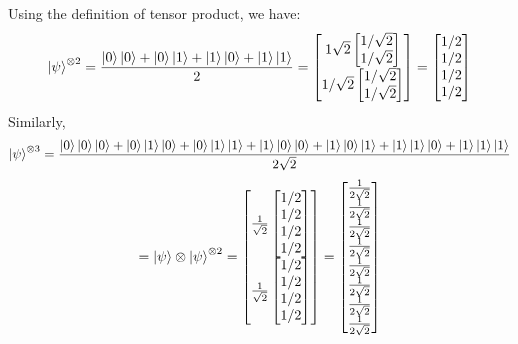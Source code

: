 \begin{example}
Using the definition of tensor product, we have:
\[
\ket{\psi}^{\otimes 2} = \frac{\ket{0}\ket{0}+\ket{0}\ket{1}+\ket{1}\ket{0}+\ket{1}\ket{1}}{2}=\begin{bmatrix} 1\sqrt{2}\begin{bmatrix} 1/\sqrt{2} \\ 1/\sqrt{2} \end{bmatrix} \\ 1/\sqrt{2} \begin{bmatrix} 1/\sqrt{2} \\ 1/\sqrt{2} \end{bmatrix} \end{bmatrix} = \begin{bmatrix} 1/2 \\ 1/2 \\ 1/2 \\1/2 \end{bmatrix}
\]
Similarly,
\[
\ket{\psi}^{\otimes 3}=\frac{\ket{0}\ket{0}\ket{0}+\ket{0}\ket{1}\ket{0}+\ket{0}\ket{1}\ket{1}+\ket{1}\ket{0}\ket{0}+\ket{1}\ket{0}\ket{1}+\ket{1}\ket{1}\ket{0}+\ket{1}\ket{1}\ket{1}}{2\sqrt{2}}
\]
\[
=\ket{\psi}\otimes \ket{\psi}^{\otimes 2}=\begin{bmatrix} \frac{1}{\sqrt{2}} \begin{bmatrix} 1/2 \\1/2 \\ 1/2 \\ 1/2 \end{bmatrix} \\ \frac{1}{\sqrt{2}} \begin{bmatrix}1/2 \\ 1/2 \\ 1/2 \\ 1/2 \end{bmatrix} \end{bmatrix} = \begin{bmatrix} \frac{1}{2\sqrt{2}} \\ \frac{1}{2\sqrt{2}} \\\frac{1}{2\sqrt{2}}\\\frac{1}{2\sqrt{2}}\\\frac{1}{2\sqrt{2}}\\\frac{1}{2\sqrt{2}}\\\frac{1}{2\sqrt{2}}\\\frac{1}{2\sqrt{2}} \end{bmatrix}
\]
\end{example}

